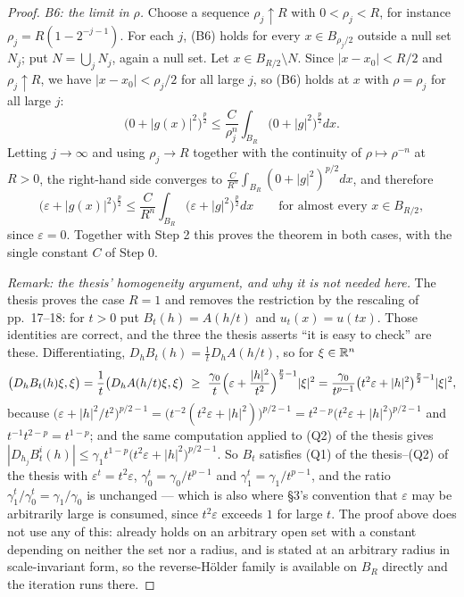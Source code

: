 \begin{proof}
\emph{B6: the limit in $\rho$.}  Choose a sequence $\rho_j\uparrow R$ with
$0<\rho_j<R$, for instance $\rho_j=R(1-2^{-j-1})$.  For each $j$, (B6) holds for
every $x\in B_{\rho_j/2}$ outside a null set $N_j$; put $N=\bigcup_jN_j$, again a
null set.  Let $x\in B_{R/2}\setminus N$.  Since $|x-x_0|<R/2$ and
$\rho_j\uparrow R$, we have $|x-x_0|<\rho_j/2$ for all large $j$, so (B6) holds
at $x$ with $\rho=\rho_j$ for all large $j$:
\[
\bigl(0+|g(x)|^2\bigr)^{\frac p2}
\le\frac{C}{\rho_j^n}\int_{B_R}\bigl(0+|g|^2\bigr)^{\frac p2}dx .
\]
Letting $j\to\infty$ and using $\rho_j\to R$ together with the continuity of
$\rho\mapsto\rho^{-n}$ at $R>0$, the right-hand side converges to
$\frac C{R^n}\int_{B_R}(0+|g|^2)^{p/2}dx$, and therefore
\[
\bigl(\varepsilon+|g(x)|^2\bigr)^{\frac p2}
\le\frac{C}{R^n}\int_{B_R}\bigl(\varepsilon+|g|^2\bigr)^{\frac p2}dx
\qquad\text{for almost every }x\in B_{R/2},
\]
since $\varepsilon=0$.  Together with Step 2 this proves the theorem in both
cases, with the single constant $C$ of Step 0.

\emph{Remark: the thesis' homogeneity argument, and why it is not needed here.}
The thesis proves the case $R=1$ and removes the restriction by the rescaling of
pp.~17--18: for $t>0$ put $B_t(h)=A(h/t)$ and $u_t(x)=u(tx)$.  Those identities
are correct, and the three the thesis asserts ``it is easy to check'' are these.
Differentiating, $D_hB_t(h)=\frac1tD_hA(h/t)$, so for $\xi\in\mathbb{R}^n$
\[
\bigl(D_hB_t(h)\xi,\xi\bigr)=\frac1t\bigl(D_hA(h/t)\xi,\xi\bigr)
\ \ge\ \frac{\gamma_0}t\Bigl(\varepsilon+\frac{|h|^2}{t^2}\Bigr)^{\frac p2-1}|\xi|^2
=\frac{\gamma_0}{t^{p-1}}\bigl(t^2\varepsilon+|h|^2\bigr)^{\frac p2-1}|\xi|^2 ,
\]
because
$\bigl(\varepsilon+|h|^2/t^2\bigr)^{p/2-1}
=\bigl(t^{-2}(t^2\varepsilon+|h|^2)\bigr)^{p/2-1}
=t^{2-p}\bigl(t^2\varepsilon+|h|^2\bigr)^{p/2-1}$ and
$t^{-1}t^{2-p}=t^{1-p}$; and the same computation applied to (Q2) of the thesis gives
$|D_{h_j}B_t^i(h)|\le\gamma_1t^{1-p}\bigl(t^2\varepsilon+|h|^2\bigr)^{p/2-1}$.
So $B_t$ satisfies (Q1) of the thesis--(Q2) of the thesis with
$\varepsilon^t=t^2\varepsilon$, $\gamma_0^t=\gamma_0/t^{p-1}$ and
$\gamma_1^t=\gamma_1/t^{p-1}$, and the ratio
$\gamma_1^t/\gamma_0^t=\gamma_1/\gamma_0$ is unchanged --- which is also where
\S3's convention that $\varepsilon$ may be arbitrarily large is consumed, since
$t^2\varepsilon$ exceeds $1$ for large $t$.  The proof above does not use any of
this:  already holds on an arbitrary open set
with a constant depending on neither the set nor a radius, and
 is stated at an arbitrary radius in
scale-invariant form, so the reverse-H\"older family is available on $B_R$
directly and the iteration runs there.
\end{proof}
